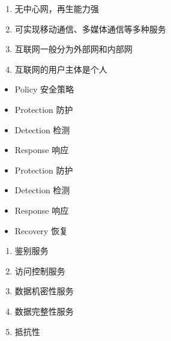 \begin{enumerate}
	\item 无中心网，再生能力强
	\item 可实现移动通信、多媒体通信等多种服务
	\item 互联网一般分为外部网和内部网
	\item 互联网的用户主体是个人
\end{enumerate}
\begin{itemize}
	\item Policy 安全策略
	\item Protection 防护
	\item Detection  检测
	\item Response 响应
\end{itemize}
\begin{itemize}
	\item Protection 防护
	\item Detection 检测
	\item Response 响应
	\item Recovery 恢复
\end{itemize}
\begin{enumerate}
	\item 鉴别服务
	\item 访问控制服务
	\item 数据机密性服务
	\item 数据完整性服务
	\item 抵抗性
\end{enumerate}